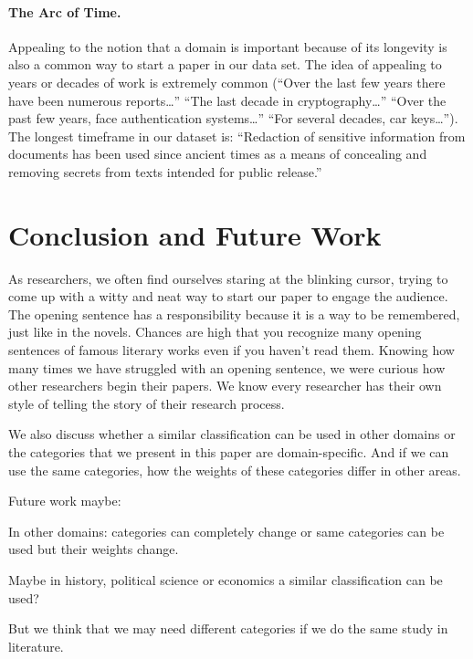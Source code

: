 \documentclass[sigconf,anonymous]{acmart}
\begin{document}
\paragraph{The Arc of Time.} Appealing to the notion that a domain is important because of its longevity is also a common way to start a paper in our data set. The idea of appealing to years or decades of work is extremely common (``Over the last few years there have been numerous reports…'' ``The last decade in cryptography…'' ``Over the past few years, face authentication systems…'' ``For several decades, car keys…''). The longest timeframe in our dataset is: ``Redaction of sensitive information from documents has been used since ancient times as a means of concealing and removing secrets from texts intended for public release.''


	\section{Conclusion and Future Work}
	
	As researchers, we often find ourselves staring at the blinking cursor, trying to come up with a witty and neat way to start our paper to engage the audience. The opening sentence has a responsibility because it is a way to be remembered, just like in the novels. Chances are high that you recognize many opening sentences of famous literary works even if you haven’t read them. Knowing how many times we have struggled with an opening sentence, we were curious how other researchers begin their papers. We know every researcher has their own style of telling the story of their research process. 
	
	We also discuss whether a similar classification can be used in other domains or the categories that we present in this paper are domain-specific. And if we can use the same categories, how the weights of these categories differ in other areas.
	
	Future work maybe:
	
	In other domains: categories can completely change or same categories can be used but their weights change.
	
	Maybe in history, political science or economics a similar classification can be used?
	
	But we think that we may need different categories if we do the same study in literature. 
	

	
	
	
	
	
\end{document}

